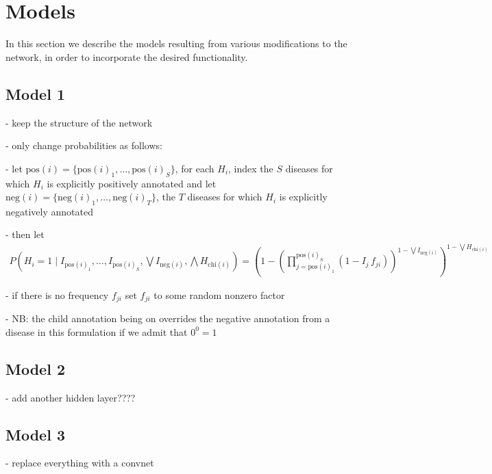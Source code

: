 \section{Models}
\label{sec:models}

In this section we describe the models resulting from various modifications to the network, in order to incorporate the desired functionality.

\subsection*{Model 1}

- keep the structure of the network

- only change probabilities as follows:

- let $\text{pos}(i) = \{\text{pos}(i)_1, \hdots, \text{pos}(i)_S\}$, for each $H_i$, index the $S$ diseases for which $H_i$ is explicitly positively annotated
and
let $\text{neg}(i) = \{\text{neg}(i)_1, \hdots, \text{neg}(i)_T\}$, the $T$ diseases for which $H_i$ is explicitly negatively annotated

- then let 
\begin{align*}
    P\left(H_i = 1 \mid I_{\text{pos}(i)_1}, \hdots, I_{\text{pos}(i)_S}, \bigvee I_{\text{neg}(i)}, \bigwedge H_{\text{chi}(i)}\right)
        = \left(
            1 - 
            \left(
                \prod_{j=\text{pos}(i)_1}^{\text{pos}(i)_S}
                \left(1 - I_j \, f_{ji}\right)
            \right) ^{1 - \bigvee I_{\text{neg}(i)}}
        \right)
        ^{1 - \bigvee H_{\text{chi}(i)}}
\end{align*}

- if there is no frequency $f_{ji}$ set $f_{ji}$ to some random nonzero factor

- NB: the child annotation being on overrides the negative annotation from a disease in this formulation if we admit that $0^0 = 1$ 

\subsection*{Model 2}

- add another hidden layer????

\subsection*{Model 3}

- replace everything with a convnet